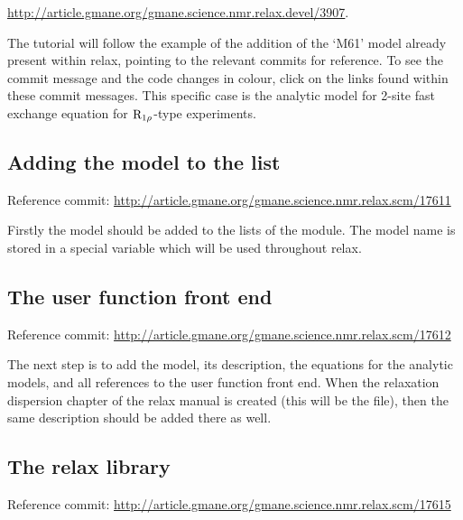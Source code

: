 \href{http://article.gmane.org/gmane.science.nmr.relax.devel/3907}{http://article.gmane.org/gmane.science.nmr.relax.devel/3907}.

The tutorial will follow the example of the addition of the `M61' model already present within relax, pointing to the relevant commits for reference.  To see the commit message and the code changes in colour, click on the links found within these commit messages.  This specific case is the \citet{Meiboom61} analytic model for 2-site fast exchange equation for $\mathrm{R}_{1\rho}$-type experiments.


\subsection{Adding the model to the list}

Reference commit:  \href{http://article.gmane.org/gmane.science.nmr.relax.scm/17611}{http://article.gmane.org/gmane.science.nmr.relax.scm/17611}

Firstly the model should be added to the lists of the  module.  The model name is stored in a special variable which will be used throughout relax.


\subsection{The  user function front end}

Reference commit:  \href{http://article.gmane.org/gmane.science.nmr.relax.scm/17612}{http://article.gmane.org/gmane.science.nmr.relax.scm/17612}

The next step is to add the model, its description, the equations for the analytic models, and all references to the  user function front end.  When the relaxation dispersion chapter of the relax manual is created (this will be the  file), then the same description should be added there as well.


\subsection{The relax library}

Reference commit:  \href{http://article.gmane.org/gmane.science.nmr.relax.scm/17615}{http://article.gmane.org/gmane.science.nmr.relax.scm/17615}


